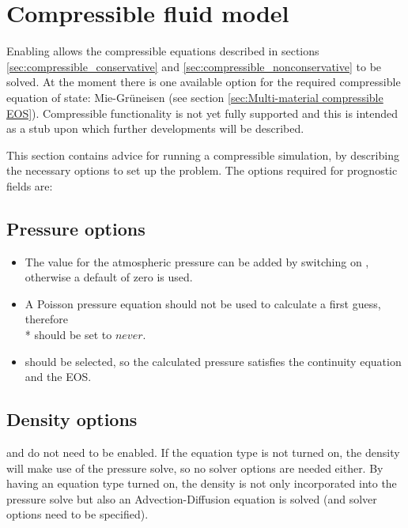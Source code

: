 \section{Compressible fluid model}

Enabling  allows the compressible equations described in sections
\ref{sec:compressible_conservative} and \ref{sec:compressible_nonconservative} to be solved. At the moment there is one available option for the required
compressible equation of state: Mie-Gr\"uneisen (see section \ref{sec:Multi-material compressible EOS}).  Compressible functionality is not yet fully supported and this is intended as a stub upon which further developments will be described.

This section contains advice for running a compressible simulation, by describing the necessary options to set up the problem. The options required for prognostic fields are:

\subsection{Pressure options}
\begin{itemize}
\item The value for the atmospheric pressure can be added by switching on , otherwise a default of zero is used.
\item A Poisson pressure equation should not be used to calculate a first guess, therefore \\*  should be set to $never$.
\item {} should be selected, so the calculated pressure satisfies the continuity equation and the EOS.
\end{itemize}

\subsection{Density options}
 and  do not need to be enabled. If the equation type is not turned on, the density will make
use of the pressure solve, so no solver options are needed either. By having an equation type turned on, the density is not only incorporated into the pressure solve
but also an Advection-Diffusion equation is solved (and solver options need to be specified).

